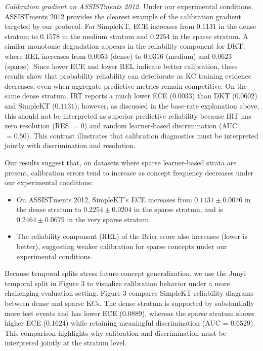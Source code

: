 \textit{Calibration gradient on ASSISTments 2012.}
Under our experimental conditions, ASSISTments 2012 provides the clearest example of the calibration gradient targeted by our protocol. For SimpleKT, ECE increases from $0.1131$ in the dense stratum to $0.1578$ in the medium stratum and $0.2254$ in the sparse stratum. A similar monotonic degradation appears in the reliability component for DKT, where REL increases from $0.0053$ (dense) to $0.0316$ (medium) and $0.0623$ (sparse). Since lower ECE and lower REL indicate better calibration, these results show that probability reliability can deteriorate as KC training evidence decreases, even when aggregate predictive metrics remain competitive. On the same dense stratum, IRT reports a much lower ECE ($0.0033$) than DKT ($0.0602$) and SimpleKT ($0.1131$); however, as discussed in the base-rate explanation above, this should not be interpreted as superior predictive reliability because IRT has zero resolution (RES $=0$) and random learner-based discrimination (AUC $=0.50$). This contrast illustrates that calibration diagnostics must be interpreted jointly with discrimination and resolution.

Our results suggest that, on datasets where sparse learner-based strata are present, calibration errors tend to increase as concept frequency decreases under our experimental conditions:
\begin{itemize}
    \item On ASSISTments 2012, SimpleKT's ECE increases from $0.1131 \pm 0.0076$ in the dense stratum to $0.2254 \pm 0.0204$ in the sparse stratum, and is $0.2464 \pm 0.0679$ in the very sparse stratum.
    \item The reliability component (REL) of the Brier score also increases (lower is better), suggesting weaker calibration for sparse concepts under our experimental conditions.
\end{itemize}

Because temporal splits stress future-concept generalization, we use the Junyi temporal split in Figure 3 to visualize calibration behavior under a more challenging evaluation setting. Figure 3 compares SimpleKT reliability diagrams between dense and sparse KCs. The dense stratum is supported by substantially more test events and has lower ECE (0.0889), whereas the sparse stratum shows higher ECE (0.1624) while retaining meaningful discrimination (AUC = 0.6529). This comparison highlights why calibration and discrimination must be interpreted jointly at the stratum level.

